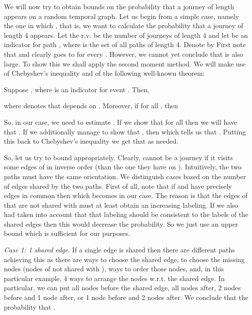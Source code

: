 \documentclass[oribibl, 11pt]{llncs}
\begin{document}
We will now try to obtain bounds on the probability that a journey of length  appears on a random temporal graph. Let us begin from a simple case, namely the one in which , that is, we want to calculate the probability that a journey of length 4 appears. Let the r.v.  be the number of journeys of length 4 and let  be an indicator for path , where  is the set of all paths of length 4. Denote  by  First note that  and clearly goes to  for every . However, we cannot yet conclude that  is also large. To show this we shall apply the second moment method. We will make use of Chebyshev's inequality  and of the following well-known theorem:

\begin{theorem} \label{the:secmom}
Suppose , where  is an indicator for event . Then,

where  denotes that  depends on . Moreover, if  for all , then

\end{theorem}

So, in our case, we need to estimate . If we show that  for all  then we will have that . If we additionally manage to show that , then  which tells us that . Putting this back to Chebyshev's inequality we get that  as needed. 

So, let us try to bound  appropriately. Clearly,  cannot be a journey if it visits some edges of  in inverse order (than the one they have on ). Intuitively, the two paths must have the same orientation. We distinguish cases based on the number of edges shared by the two paths. First of all, note that if  and  have precisely  edges in common then  which becomes  in our case. The reason is that the  edges of  that are not shared with  must at least obtain an increasing labeling. If we also had taken into account that that labeling should be consistent to the labels of the shared edges then this would decrease the probability. So we just use an upper bound which is sufficient for our purposes. 

\emph{Case 1: 1 shared edge.} If a single edge is shared then there are  different paths  achieving this as there are  ways to choose the shared edge,  to choose the missing nodes (nodes of  not shared with ),  ways to order those nodes, and, in this particular example, 4 ways to arrange the nodes w.r.t. the shared edge. In particular, we can put all nodes before the shared edge, all nodes after, 2 nodes before and 1 node after, or 1 node before and 2 nodes after. We conclude that the probability that .
\end{document}
